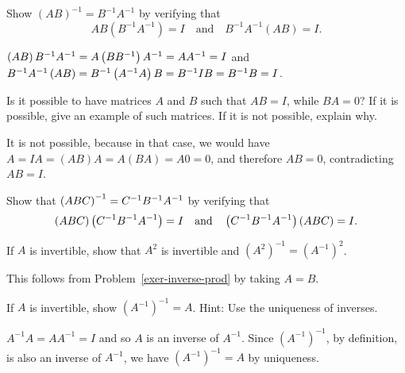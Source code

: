 \begin{enumialphparenastyle}
\begin{ex}\label{exer-inverse-prod}
  Show $(AB)^{-1}=B^{-1}A^{-1}$ by verifying that
  \begin{equation*}
    AB(B^{-1}A^{-1}) = I
    \quad\mbox{and}\quad
    B^{-1}A^{-1}(AB) = I.
  \end{equation*}
  \vspace{-4ex}
  \begin{sol}
    $\left(AB\right)
    B^{-1}A^{-1}=A\left(BB^{-1}\right) A^{-1}=AA^{-1}=I$ and  $B^{-1}A^{-1}\left(
      AB\right) =B^{-1}\left(A^{-1}A\right) B=B^{-1}IB=B^{-1}B=I$.
  \end{sol}
\end{ex}

\begin{ex}
  Is it possible to have matrices $A$ and $B$ such that $AB=I$, while
  $BA=0$? If it is possible, give an example of such matrices. If it
  is not possible, explain why.
  \begin{sol}
    It is not possible, because in that case, we would have
    $A=IA=(AB)A=A(BA)=A0=0$, and therefore $AB=0$, contradicting $AB=I$.
  \end{sol}
\end{ex}

\begin{ex}
  Show that $\left(ABC\right) ^{-1}=C^{-1}B^{-1}A^{-1}$ by verifying that
  \begin{equation*}
    \left(ABC\right) \left(C^{-1}B^{-1}A^{-1}\right) = I
    \quad\mbox{and}\quad
    \left(C^{-1}B^{-1}A^{-1}\right)\left(ABC\right) = I.
  \end{equation*} 
\end{ex}

\begin{ex}
  If $A$ is invertible, show that $A^2$ is invertible and
  $(A^{2})^{-1}=(A^{-1})^{2}$.
  \begin{sol}
    This follows from Problem~\ref{exer-inverse-prod} by taking $A=B$.
  \end{sol}
\end{ex}

\begin{ex}If $A$ is invertible, show $(A^{-1})^{-1}=A$.
  Hint: Use the uniqueness of inverses. 
  \begin{sol}
    $A^{-1}A=AA^{-1}=I$ and so $A$ is an inverse of $A^{-1}$. Since
    $(A^{-1})^{-1}$, by definition, is also an inverse of $A^{-1}$, we
    have $(A^{-1})^{-1}=A$ by uniqueness.
  \end{sol}
\end{ex}


\end{enumialphparenastyle}
